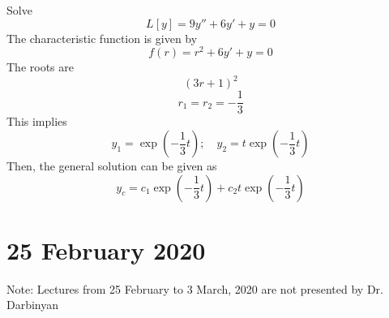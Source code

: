\documentclass[twoside]{report}
\begin{document}
    \np
    \begin{example}
        Solve
        \begin{equation}
            L[y] = 9y'' + 6y' + y = 0
        \end{equation}
        The characteristic function is given by
        \begin{equation}
            f(r) = r^{2} + 6y' + y = 0
        \end{equation}
        The roots are
        \begin{equation}
            (3r + 1)^{2}
        \end{equation}
        \begin{equation}
            r_{1} = r_{2} = -\frac{1}{3}
        \end{equation}
        This implies
        \begin{equation}
            y_{1} = \exp(-\frac{1}{3}t);\quad y_{2} = t\exp(-\frac{1}{3}t)
        \end{equation}
        Then, the general solution can be given as
        \begin{equation}
            y_{c} = c_{1}\exp(-\frac{1}{3}t) + c_{2}t\exp(-\frac{1}{3}t)
        \end{equation}
    \end{example}
    \chapter{25 February 2020}
    Note: Lectures from 25 February to 3 March, 2020 are not presented by Dr. Darbinyan
\end{document}
